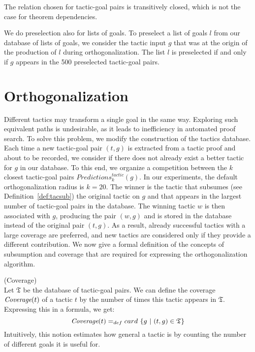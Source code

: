 \documentclass[runningheads,a4paper,draft]{svjour3}
\begin{document}
\begin{remark}
The relation chosen for tactic-goal pairs is transitively closed, which is not
the case for theorem dependencies.
\end{remark}

We do preselection also for lists of goals.
To preselect a list of goals $l$ from our database of lists of goals, we
consider the tactic input $g$ that was at the origin of the production of $l$
during orthogonalization. The list $l$ is preselected if and only if $g$
appears in the 500 preselected tactic-goal pairs.

\section{Orthogonalization}\label{sec:ortho}
Different tactics may transform a single goal in the same way. Exploring such
equivalent paths
is undesirable, as it leads to inefficiency in automated proof search.
To solve this problem, we modify the construction of the tactics database.
Each time a new tactic-goal pair $(t,g)$ is extracted from a tactic proof and
about to be recorded, we consider if there does not already exist a better
tactic for $g$ in our database. To this end, we organize a competition between
the
$k$ closest tactic-goal pairs $\mathit{Predictions}^{\mathit{tactic}}_k(g)$.
In our experiments,
the default orthogonalization radius is $k=20$.
The winner is the tactic that subsumes (see Definition~\ref{def:tacsub}) the
original tactic on $g$ and that
appears in the largest number of tactic-goal pairs in the database.
The winning tactic $w$ is then associated with $g$, producing the pair $(w,g)$
and is stored in the database instead of the original pair $(t,g)$.
As a result, already successful tactics with a large coverage are preferred,
and new tactics are considered only if they provide a different contribution.
We now give a formal definition of the concepts of subsumption and coverage
that are required for expressing the orthogonalization algorithm.

\begin{definition} (Coverage)\\
Let $\mathfrak{T}$ be the database of tactic-goal pairs. We can define the
coverage $\textit{\mbox{Coverage}}(t)$ of a tactic $t$ by the number of times
this tactic
appears in
$\mathfrak{T}$. Expressing this in a formula, we get:
  \[\textit{\mbox{Coverage}}(t) =_{def} card\ \lbrace g\ |\ (t,g) \in
  \mathfrak{T} \rbrace \]
Intuitively, this notion estimates how general a tactic is by counting the
number of different goals it is useful for.
\end{definition}
\end{document}

